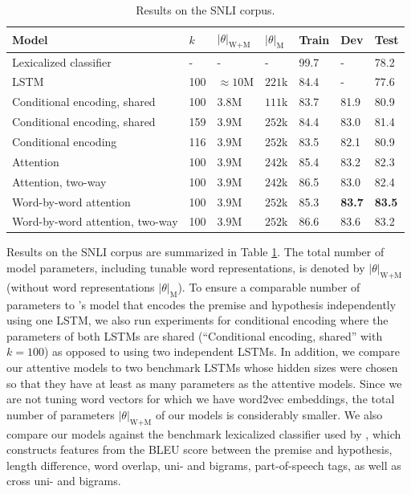 \documentclass{article}
\begin{document}
\begin{table}
  \caption{Results on the SNLI corpus.}
  \label{tab:results}
  \centering
  \begin{tabular}{lllllll}
  	\toprule
  	Model & $k$ & $|\theta|_\text{W+M}$ & $|\theta|_\text{M}$ & Train & Dev & Test\\
  	\midrule
  	Lexicalized classifier \citep{bowman2015large} & - & - & - &  99.7 & - & 78.2\\
  	LSTM \citep{bowman2015large} & 100 & $\approx 10$M & $221$k & 84.4 & - & 77.6\\
  	\midrule
  	Conditional encoding, shared & 100 & $3.8$M & $111$k & 83.7 & 81.9 & 80.9\\
    Conditional encoding, shared & 159 & $3.9$M & $252$k & 84.4 & 83.0 & 81.4\\
    Conditional encoding & 116 & $3.9$M & $252$k & 83.5 & 82.1 & 80.9\\
  	\midrule
  	Attention & 100 & $3.9$M & $242$k & 85.4 & 83.2 & 82.3\\
    Attention, two-way & 100 & $3.9$M & $242$k & 86.5 & 83.0 & 82.4 \\
  	\midrule
  	Word-by-word attention & 100 & $3.9$M & $252$k & 85.3 & \textbf{83.7} & \textbf{83.5}\\
    Word-by-word attention, two-way & 100 & $3.9$M & $252$k & 86.6 & 83.6 & 83.2 \\
  	\bottomrule
  \end{tabular}
\end{table}

Results on the SNLI corpus are summarized in Table \ref{tab:results}.
The total number of model parameters, including tunable word representations, is denoted by $|\theta|_\text{W+M}$ (without word representations $|\theta|_\text{M}$).
To ensure a comparable number of parameters to \citeauthor{bowman2015large}'s model that encodes the premise and hypothesis independently using one LSTM, we also run experiments for conditional encoding where the parameters of both LSTMs are shared (``Conditional encoding, shared'' with $k=100$) as opposed to using two independent LSTMs.
In addition, we compare our attentive models to two benchmark LSTMs whose hidden sizes were chosen so that they have at least as many parameters as the attentive models.
Since we are not tuning word vectors for which we have word2vec embeddings, the total number of parameters $|\theta|_\text{W+M}$ of our models is considerably smaller.
We also compare our models against the benchmark lexicalized classifier used by \citeauthor{bowman2015large}, which constructs features from the BLEU score between the premise and hypothesis, length difference, word overlap, uni- and bigrams, part-of-speech tags, as well as cross uni- and bigrams.
\end{document}
